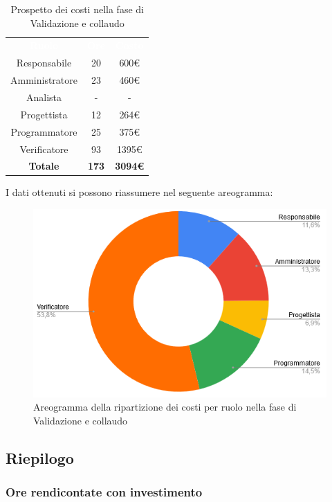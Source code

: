 \begin{table}[H]
\centering\renewcommand{\arraystretch}{1.5}
\caption{Prospetto dei costi nella fase di Validazione e collaudo}
\vspace{0.2cm}
\begin{tabular}{ c c c }
\rowcolor{redafk}
\textcolor{white}{\textbf{Ruolo}} & \textcolor{white}{\textbf{Ore}} & 
\textcolor{white}{\textbf{Costo}}  \\
Responsabile & 20 & 600€ \\
Amministratore & 23 & 460€ \\
Analista & - & - \\
Progettista	& 12 & 264€ \\
Programmatore & 25 & 375€  \\
Verificatore & 93 & 1395€  \\
\rowcolor{lastrowcolor}
\textbf{Totale} & \textbf{173} & \textbf{3094€}  \\
\end{tabular}
\end{table}

I dati ottenuti si possono riassumere nel seguente areogramma:
\begin{figure}[H]
\centering
\includegraphics[scale=0.60]{img/grafici/torta_fase_val_col.png}
\caption{Areogramma della ripartizione dei costi per ruolo nella fase di Validazione e collaudo}
\end{figure}


\subsection{Riepilogo}
\subsubsection{Ore rendicontate con investimento}
